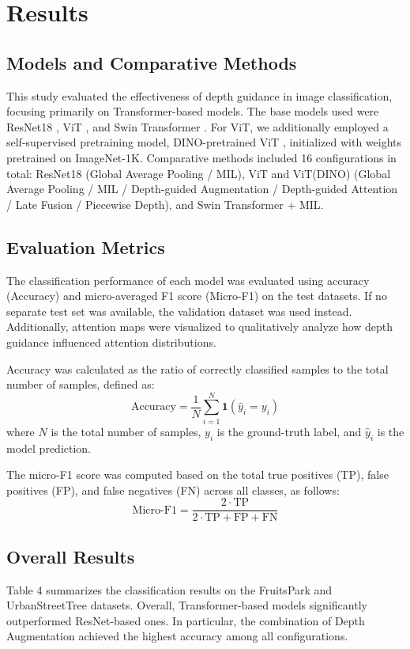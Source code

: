 \section{Results}

\subsection{Models and Comparative Methods}
This study evaluated the effectiveness of depth guidance in image classification, focusing primarily on Transformer-based models. The base models used were ResNet18 \cite{ref12}, ViT \cite{ref1}, and Swin Transformer \cite{ref14}. For ViT, we additionally employed a self-supervised pretraining model, DINO-pretrained ViT \cite{ref13}, initialized with weights pretrained on ImageNet-1K. Comparative methods included 16 configurations in total: ResNet18 (Global Average Pooling / MIL), ViT and ViT(DINO) (Global Average Pooling / MIL / Depth-guided Augmentation / Depth-guided Attention / Late Fusion / Piecewise Depth), and Swin Transformer + MIL.

\subsection{Evaluation Metrics}
The classification performance of each model was evaluated using accuracy (Accuracy) and micro-averaged F1 score (Micro-F1) on the test datasets. If no separate test set was available, the validation dataset was used instead. Additionally, attention maps were visualized to qualitatively analyze how depth guidance influenced attention distributions. 

Accuracy was calculated as the ratio of correctly classified samples to the total number of samples, defined as:
\begin{equation}\tag{14}
\mathrm{Accuracy}=\frac{1}{N}\sum_{i=1}^{N}\mathbf{1}(\hat{y}_i=y_i)
\end{equation}
where $N$ is the total number of samples, $y_i$ is the ground-truth label, and $\hat{y}_i$ is the model prediction. 

The micro-F1 score was computed based on the total true positives (TP), false positives (FP), and false negatives (FN) across all classes, as follows:
\begin{equation}\tag{15}
\mathrm{Micro\text{-}F1}=\frac{2\cdot \mathrm{TP}}{2\cdot \mathrm{TP}+\mathrm{FP}+\mathrm{FN}}
\end{equation}

\subsection{Overall Results}
Table 4 summarizes the classification results on the FruitsPark and UrbanStreetTree datasets. Overall, Transformer-based models significantly outperformed ResNet-based ones. In particular, the combination of Depth Augmentation achieved the highest accuracy among all configurations.

